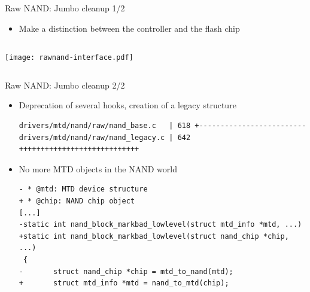\documentclass[aspectratio=169,obeyspaces,spaces,hyphens,dvipsnames]{beamer}
\begin{document}
\begin{frame}{Raw NAND: Jumbo cleanup 1/2}
  \begin{itemize}
  \item Make a distinction between the controller and the flash chip
  \end{itemize}
  \vfill
  \begin{columns}
    \begin{center}
      \texttt{[image: rawnand-interface.pdf]}
    \end{center}
  \end{columns}
\end{frame}

\begin{frame}[fragile]{Raw NAND: Jumbo cleanup 2/2}
  \begin{itemize}
  \item Deprecation of several hooks, creation of a legacy structure
    \begin{block}{}
\begin{verbatim}
drivers/mtd/nand/raw/nand_base.c   | 618 +-------------------------
drivers/mtd/nand/raw/nand_legacy.c | 642 ++++++++++++++++++++++++++++
\end{verbatim}
    \end{block}
  \item No more MTD objects in the NAND world
    \begin{block}{}
\begin{verbatim}
- * @mtd: MTD device structure
+ * @chip: NAND chip object
[...]
-static int nand_block_markbad_lowlevel(struct mtd_info *mtd, ...)
+static int nand_block_markbad_lowlevel(struct nand_chip *chip, ...)
 {
-       struct nand_chip *chip = mtd_to_nand(mtd);
+       struct mtd_info *mtd = nand_to_mtd(chip);
\end{verbatim}
    \end{block}
  \end{itemize}
\end{frame}
\end{document}

